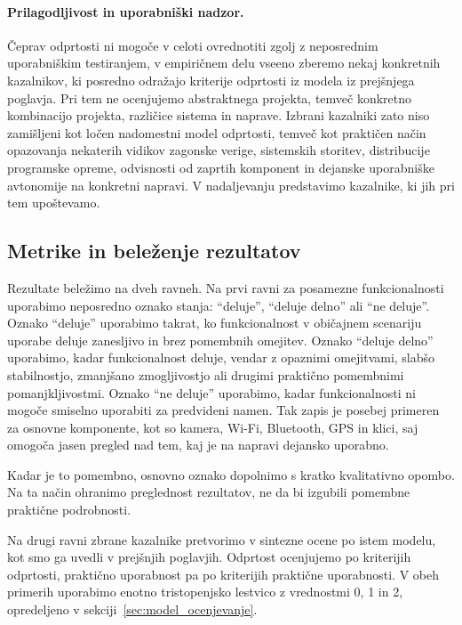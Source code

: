 \documentclass[a4paper,12pt,openright]{book}
\begin{document}
\paragraph{Prilagodljivost in uporabniški nadzor.}
Čeprav odprtosti ni mogoče v celoti ovrednotiti zgolj z neposrednim uporabniškim testiranjem, v empiričnem delu vseeno zberemo nekaj konkretnih kazalnikov, ki posredno odražajo kriterije odprtosti iz modela iz prejšnjega poglavja.
Pri tem ne ocenjujemo abstraktnega projekta, temveč konkretno kombinacijo projekta, različice sistema in naprave.
Izbrani kazalniki zato niso zamišljeni kot ločen nadomestni model odprtosti, temveč kot praktičen način opazovanja nekaterih vidikov zagonske verige, sistemskih storitev, distribucije programske opreme, odvisnosti od zaprtih komponent in dejanske uporabniške avtonomije na konkretni napravi.
V nadaljevanju predstavimo kazalnike, ki jih pri tem upoštevamo.

\subsection{Metrike in beleženje rezultatov}
\label{subsec:metrike_belezenje}

Rezultate beležimo na dveh ravneh.
Na prvi ravni za posamezne funkcionalnosti uporabimo neposredno oznako stanja: \enquote{deluje}, \enquote{deluje delno} ali \enquote{ne deluje}.
Oznako \enquote{deluje} uporabimo takrat, ko funkcionalnost v običajnem scenariju uporabe deluje zanesljivo in brez pomembnih omejitev.
Oznako \enquote{deluje delno} uporabimo, kadar funkcionalnost deluje, vendar z opaznimi omejitvami, slabšo stabilnostjo, zmanjšano zmogljivostjo ali drugimi praktično pomembnimi pomanjkljivostmi.
Oznako \enquote{ne deluje} uporabimo, kadar funkcionalnosti ni mogoče smiselno uporabiti za predvideni namen.
Tak zapis je posebej primeren za osnovne komponente, kot so kamera, Wi-Fi, Bluetooth, GPS in klici, saj omogoča jasen pregled nad tem, kaj je na napravi dejansko uporabno.

Kadar je to pomembno, osnovno oznako dopolnimo s kratko kvalitativno opombo.
Na ta način ohranimo preglednost rezultatov, ne da bi izgubili pomembne praktične podrobnosti.

Na drugi ravni zbrane kazalnike pretvorimo v sintezne ocene po istem modelu, kot smo ga uvedli v prejšnjih poglavjih.
Odprtost ocenjujemo po kriterijih odprtosti, praktično uporabnost pa po kriterijih praktične uporabnosti.
V obeh primerih uporabimo enotno tristopenjsko lestvico z vrednostmi 0, 1 in 2, opredeljeno v sekciji~\ref{sec:model_ocenjevanje}.
\end{document}
